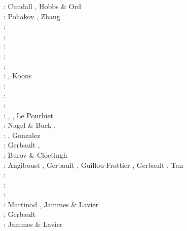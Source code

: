\begin{itemize}
\begin{scriptsize}
\nineteeneightynine: Cundall \cite{cund89}, Hobbs \& Ord \cite{hoor89}\\
\nineteenninetythree: Poliakov \etal \cite{pocp93}, Zhang \etal \cite{zhhj93}\\
\nineteenninetyfour: \cite{wizh94}\\
\nineteenninetysix: \cite{zhho96}\\
\nineteenninetyeight: \cite{gepd98}\\
\twothousand: \cite{labp00}\\
\twothousandone: \cite{bujl01}\cite{bupo01}\\
\twothousandtwo: \cite{bast02}\cite{clbb02}, Koons \etal \cite{kozc02}\\
\twothousandthree: \cite{hags03}\cite{gehd03}\cite{upke03}\\
\twothousandfour: \cite{guhl04}\cite{gewi04}\cite{toba04}\cite{tibb04}\cite{clbm04}\cite{tobj04}\\
\twothousandfive: \cite{bugu05}\\
\twothousandsix: \cite{buwa06}, \cite{lemm06}, Le Pourhiet \etal \cite{legs06}\\
\twothousandseven: Nagel \& Buck \cite{nabu07}, \cite{yaab07}\cite{buto07}\cite{chem07}\\
\twothousandeight: \cite{yaba08}\cite{tibb08}\cite{buya08}, Gonzalez \etal \cite{gogm08}\\
\twothousandnine: Gerbault \etal \cite{gecm09}, \cite{yahb09}\cite{bucl09}\cite{tigv09}\cite{yamb09}\\
\twothousandten: Burov \& Cloetingh \cite{bucl10}\\
\twothousandtwelve: Angiboust \etal \cite{anwb12}, Gerbault \etal \cite{gech12}, 
                    Guillou-Frottier \etal \cite{gubc12}, Gerbault \cite{gerb12}, 
                    Tan \etal \cite{talv12}\\
\twothousandthirteen: \cite{wabd13}\cite{frbm13}\cite{tibb13}\\
\twothousandfourteen: \cite{frba14}\cite{gagb14}\cite{bufa14}\cite{bufy14b}\\
\twothousandfifteen: \cite{wulc15}\cite{gebw15}\cite{svlh15}\\
\twothousandsixteen: Martinod \etal \cite{marl16}, Jammes \& Lavier \cite{jala16}\\
\twothousandeighteen: Gerbault \etal \cite{gesr18}\\
\twothousandnineteen: Jammes \& Lavier \cite{jala19}
\end{scriptsize}


\end{itemize}
